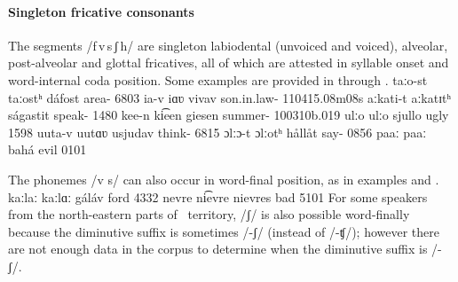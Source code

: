 \paragraph{Singleton fricative consonants}\label{fvssjh}
The segments \mbox{/f\,v\,s\,ʃ\,h/} are singleton labiodental (unvoiced and voiced), alveolar, post-alveolar and glottal fricatives, all of which are attested in syllable onset and word-internal coda position. %
Some examples are provided in  through .
	{taːo-st}		{taːostʰ}		{dáfost}	{area-}		{6803}
	{ia-v}	{iɑʋ}		{vivav}	{son.in.law-}	{110415}{.08m08s}
		{aːkati-t}	{aːkatɪtʰ}	{ságastit}	{speak-}		{1480}
	{kee-n}		{ki͡een}		{giesen}	{summer-}	{100310b}{.019}
			{ulːo}			{ulːo}			{sjullo}	{ugly\Sc{}}		{1598}
	{uuta-v}		{uutɑʋ}		{usjudav}	{think-}		{6815}
			{\Bf{h}ɔlːɔ-t}		{ɔlːotʰ}		{hållåt}	{say-}	{0856}
		{paaː}		{paaː}		{bahá}	{evil\BS{}}	{0101}

The phonemes /v s/ can also occur in word-final position, as in examples  and .%
	{kaːlaː}	{kaːlɑː}	{gáláv}	{ford\BS{}}	{4332}
		{nevre}	{ni͡evre}	{nievres}	{bad\Sc{}}	{5101}
For some speakers from the north-eastern parts of \PS\ territory, /ʃ/ is also possible word-finally because the diminutive suffix is sometimes /-ʃ/ (instead of /-ʧ/); however there are not enough data in the corpus to determine when the diminutive suffix is /-ʃ/. 


